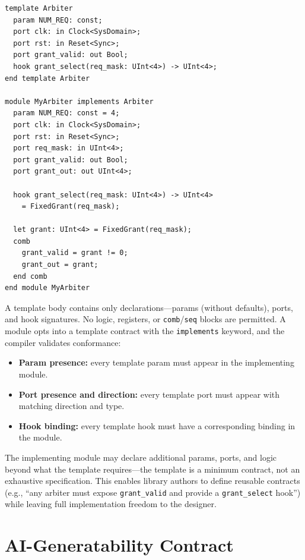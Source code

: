 \documentclass[manuscript]{acmart}
\begin{document}
\begin{lstlisting}[language=Arch,caption={Template declaration and implementation},label={lst:template}]
template Arbiter
  param NUM_REQ: const;
  port clk: in Clock<SysDomain>;
  port rst: in Reset<Sync>;
  port grant_valid: out Bool;
  hook grant_select(req_mask: UInt<4>) -> UInt<4>;
end template Arbiter

module MyArbiter implements Arbiter
  param NUM_REQ: const = 4;
  port clk: in Clock<SysDomain>;
  port rst: in Reset<Sync>;
  port req_mask: in UInt<4>;
  port grant_valid: out Bool;
  port grant_out: out UInt<4>;

  hook grant_select(req_mask: UInt<4>) -> UInt<4>
    = FixedGrant(req_mask);

  let grant: UInt<4> = FixedGrant(req_mask);
  comb
    grant_valid = grant != 0;
    grant_out = grant;
  end comb
end module MyArbiter
\end{lstlisting}

A template body contains only declarations---params (without defaults), ports, and hook signatures. No logic, registers, or \texttt{comb}/\texttt{seq} blocks are permitted. A module opts into a template contract with the \texttt{implements} keyword, and the compiler validates conformance:

\begin{itemize}
\item \textbf{Param presence:} every template param must appear in the implementing module.
\item \textbf{Port presence and direction:} every template port must appear with matching direction and type.
\item \textbf{Hook binding:} every template hook must have a corresponding binding in the module.
\end{itemize}

The implementing module may declare additional params, ports, and logic beyond what the template requires---the template is a minimum contract, not an exhaustive specification. This enables library authors to define reusable contracts (e.g., ``any arbiter must expose \texttt{grant\_valid} and provide a \texttt{grant\_select} hook'') while leaving full implementation freedom to the designer.

\section{AI-Generatability Contract}\label{sec:ai}
\end{document}
